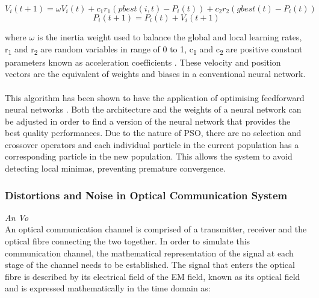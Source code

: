         \begin{equation}
            \label{eqn:pso_equation}
            V_i(t+1) = \omega V_i(t) + c_1r_1(pbest(i,t) - P_i(t)) + c_2r_2(gbest(t) - P_i(t))
        \end{equation}
        \begin{equation}
            \label{eqn:pso_equation}
            P_i(t+1) = P_i(t) + V_i(t+1)
        \end{equation}
        
        where $\omega$ is the inertia weight used to balance the global and local learning rates, r\textsubscript1 and r\textsubscript2 are random variables in range of 0 to 1, c\textsubscript1 and c\textsubscript2 are positive constant parameters known as acceleration coefficients \autocite{PSO_paper}. These velocity and position vectors are the equivalent of weights and biases in a conventional neural network.
        \\
        \\
        This algorithm has been shown to have the application of optimising feedforward neural networks \autocite{884366}. Both the architecture and the weights of a neural network can be adjusted in order to find a version of the neural network that provides the best quality performances. Due to the nature of PSO, there are no selection and crossover operators and each individual particle in the current population has a corresponding particle in the new population. This allows the system to avoid detecting local minimas, preventing premature convergence.
        
    \subsubsection{Distortions and Noise in Optical Communication System}
    \label{sec:optical_channel_distortions_theory}
    \hspace*{0pt}\hfill \textit{An Vo}\\
        
        An optical communication channel is comprised of a transmitter, receiver and the optical fibre connecting the two together. In order to simulate this communication channel, the mathematical representation of the signal at each stage of the channel needs to be established. The signal that enters the optical fibre is described by its electrical field of the EM field, known as its optical field and is expressed mathematically in the time domain as: 
    
